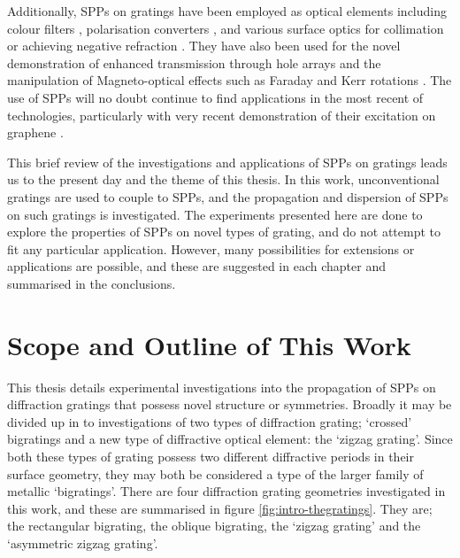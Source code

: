 Additionally, SPPs on gratings have been employed as optical elements including colour filters \cite{Cheong2009}, polarisation converters \cite{Watts1997a}, and various surface optics for collimation or achieving negative refraction \cite{Yu2010,Stein2012}. They have also been used for the novel demonstration of enhanced transmission through hole arrays \cite{Ebbesen1998,Lezec2002a,Mahboub2010a,Garcia-Vidal2005} and the manipulation of Magneto-optical effects such as Faraday and Kerr rotations \cite{Belotelov2007}. The use of SPPs will no doubt continue to find applications in the most recent of technologies, particularly with very recent demonstration of their excitation on graphene \cite{Chen2012}.

This brief review of the investigations and applications of SPPs on gratings leads us to the present day and the theme of this thesis. In this work, unconventional gratings are used to couple to SPPs, and the propagation and dispersion of SPPs on such gratings is investigated. The experiments presented here are done to explore the properties of SPPs on novel types of grating, and do not attempt to fit any particular application. However, many possibilities for extensions or applications are possible, and these are suggested in each chapter and summarised in the conclusions.


\section{Scope and Outline of This Work}

This thesis details experimental investigations into the propagation of SPPs on diffraction gratings that possess novel structure or symmetries. Broadly it may be divided up in to investigations of two types of diffraction grating; `crossed' bigratings and a new type of diffractive optical element: the `zigzag grating'. Since both these types of grating possess two different diffractive periods in their surface geometry, they may both be considered a type of the larger family of metallic `bigratings'. There are four diffraction grating geometries investigated in this work, and these are summarised in figure \ref{fig:intro-thegratings}. They are; the rectangular bigrating, the oblique bigrating, the `zigzag grating' and the `asymmetric zigzag grating'.

